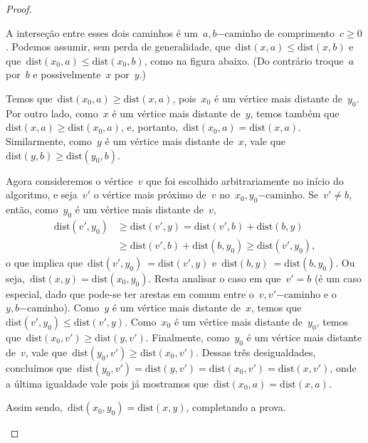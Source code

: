 \documentclass[a4paper,12pt]{article}
\newcommand{\caminho}{\mathrm{-caminho}}
\newcommand{\dist}{\mathrm{dist}}
\begin{document}
\begin{proof}
\begin{itemize}
			A interseção entre esses dois caminhos é 
			um~$a,b\caminho$ de comprimento~$c \ge 0$.
			Podemos assumir, sem perda de generalidade, 
			que~${\dist(x,a) \le \dist(x,b)}$ e 
			que~${\dist(x_0,a) \le \dist(x_0,b)}$, como na figura 
			abaixo.
			(Do contrário troque~$a$ por~$b$ e possivelmente~$x$
			por~$y$.)

			\begin{center}  \end{center}


			Temos que~${\dist(x_0,a)\ge \dist(x,a)}$,
			pois~$x_0$ é um vértice mais distante de~$y_0$.
			Por outro lado, como~$x$ é um vértice mais distante
			de~$y$, temos também que~${\dist(x,a)\ge \dist(x_0,a)}$,
			e, portanto,~${\dist(x_0,a) =\dist(x,a)}$.
			Similarmente, como~$y$ é um vértice mais distante 
			de~$x$, vale que~${\dist(y,b) \ge \dist(y_0,b)}$.

			Agora consideremos o vértice~$v$ que foi escolhido 
			arbitrariamente no início do algoritmo, e seja~$v'$
			o vértice mais próximo de~$v$ no~$x_0,y_0\caminho$.
			Se~$v'\ne b$, então, como~$y_0$ é um vértice mais 
			distante de~$v$,
			\begin{align}
				\dist(v',y_0) &\ge \dist(v',y) =\dist(v',b) + 
				\dist(b,y)\nonumber \\
				&\ge \dist(v',b) + \dist(b,y_0) \ge \dist(v',y_0) 
				\nonumber,
			\end{align} 
			o que implica que~${\dist(v',y_0)~=\dist(v',y)}$ 
			e~${\dist(b,y)~=\dist(b,y_0)}$. 
			Ou seja,~${\dist(x,y) =\dist(x_0,y_0)}$.
			Resta analisar o caso em que~$v'=b$ (é um caso 
			especial, dado que pode-se ter arestas em comum 
			entre o~$v,v'\caminho$ e o~$y,b\caminho$).
			Como~$y$ é um vértice mais distante de~$x$, temos 
			que~$\dist(v',y_0) \le \dist(v',y)$.
			Como~$x_0$ é um vértice mais distante de~$y_0$, temos
			que~$\dist(x_0,v') \ge \dist(y,v')$.
			Finalmente, como~$y_0$ é um vértice mais distante 
			de~$v$, vale que~$\dist(y_0,v')\ge \dist(x_0,v')$.
			Dessas três desigualdades, concluímos 
			que~${\dist(y_0,v')=\dist(y,v')=\dist(x_0,v')=\dist(x,v')}$,
			onde a última igualdade vale pois já mostramos 
			que~${\dist(x_0,a) =\dist(x,a)}$.

			Assim sendo,~${\dist(x_0,y_0) =\dist(x,y)}$, completando a 
			prova.
		\end{itemize}
	\end{proof}
\end{document}
